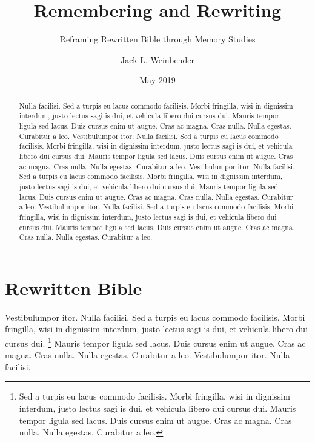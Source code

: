 \documentclass[letterpaper,12pt,oneside]{utexas-dissertation}
\begin{document}
\frontmatter

\author{Jack L. Weinbender}
\title{Remembering and Rewriting}
\subtitle{Reframing Rewritten Bible through Memory Studies}
\date{May 2019}
\maketitle


\makecopyright


\makesignatures

\begin{abstract}
Nulla facilisi. Sed a turpis eu lacus commodo facilisis. Morbi fringilla, wisi in dignissim interdum, justo lectus sagi is dui, et vehicula libero dui cursus dui. Mauris tempor ligula sed lacus. Duis cursus enim ut augue. Cras ac magna. Cras nulla. Nulla egestas. Curabitur a leo.  
Vestibulumpor itor. Nulla facilisi. Sed a turpis eu lacus commodo facilisis. Morbi fringilla, wisi in dignissim interdum, justo lectus sagi is dui, et vehicula libero dui cursus dui. Mauris tempor ligula sed lacus. Duis cursus enim ut augue. Cras ac magna. Cras nulla. Nulla egestas. Curabitur a leo. 
Vestibulumpor itor. Nulla facilisi. Sed a turpis eu lacus commodo facilisis. Morbi fringilla, wisi in dignissim interdum, justo lectus sagi is dui, et vehicula libero dui cursus dui. Mauris tempor ligula sed lacus. Duis cursus enim ut augue. Cras ac magna. Cras nulla. Nulla egestas. Curabitur a leo.  
Vestibulumpor itor. Nulla facilisi. Sed a turpis eu lacus commodo facilisis. Morbi fringilla, wisi in dignissim interdum, justo lectus sagi is dui, et vehicula libero dui cursus dui. Mauris tempor ligula sed lacus. Duis cursus enim ut augue. Cras ac magna. Cras nulla. Nulla egestas. Curabitur a leo.
\end{abstract}
\restoregeometry

\tableofcontents*

\mainmatter

\chapter{Rewritten Bible}
Vestibulumpor itor. Nulla facilisi. Sed a turpis eu lacus commodo facilisis. Morbi fringilla, wisi in dignissim interdum, justo lectus sagi is dui, et vehicula libero dui cursus dui. \footnote{Sed a turpis eu lacus commodo facilisis. Morbi fringilla, wisi in dignissim interdum, justo lectus sagi is dui, et vehicula libero dui cursus dui. Mauris tempor ligula sed lacus. Duis cursus enim ut augue. Cras ac magna. Cras nulla. Nulla egestas. Curabitur a leo.} Mauris tempor ligula sed lacus. Duis cursus enim ut augue. Cras ac magna. Cras nulla. Nulla egestas. Curabitur a leo.  
Vestibulumpor itor. Nulla facilisi. 
\end{document}
